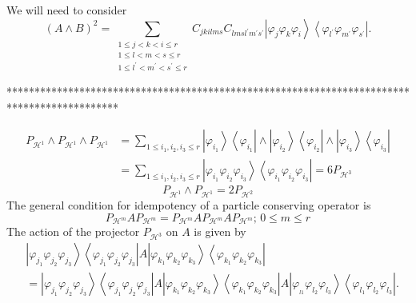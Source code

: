 \documentclass[aps,preprint]{revtex4}%
\begin{document}
We will need to consider
\begin{equation}
\left(  A\wedge B\right)  ^{2}=\sum_{\substack{1\leq j<k<i\leq r\\1\leq
l<m<s\leq r\\1\leq l^{\prime}<m^{\prime}<s^{\prime}\leq r}}C_{jkilms}%
C_{lmsl^{\prime}m^{\prime}s^{\prime}}\left\vert \varphi_{j}\varphi_{k}%
\varphi_{i}\right\rangle \left\langle \varphi_{l^{\prime}}\varphi_{m^{\prime}%
}\varphi_{s^{\prime}}\right\vert .
\end{equation}


********************************************************************************************%

\begin{align}
P_{\mathcal{H}^{1}}\wedge P_{\mathcal{H}^{1}}\wedge P_{\mathcal{H}^{1}}  &
=\sum_{1\leq i_{1},i_{2},i_{3}\leq r}\left\vert \varphi_{i_{1}}\right\rangle
\left\langle \varphi_{i_{1}}\right\vert \wedge\left\vert \varphi_{i_{2}%
}\right\rangle \left\langle \varphi_{i_{2}}\right\vert \wedge\left\vert
\varphi_{i_{3}}\right\rangle \left\langle \varphi_{i_{3}}\right\vert \\
&  =\sum_{1\leq i_{1},i_{2},i_{3}\leq r}\left\vert \varphi_{i_{1}}%
\varphi_{i_{2}}\varphi_{i_{3}}\right\rangle \left\langle \varphi_{i_{1}%
}\varphi_{i_{2}}\varphi_{i_{3}}\right\vert =6P_{\mathcal{H}^{3}}%
\end{align}%
\begin{equation}
P_{\mathcal{H}^{1}}\wedge P_{\mathcal{H}^{1}}=2P_{\mathcal{H}^{2}}%
\end{equation}
The general condition for idempotency of a particle conserving operator is
\begin{equation}
P_{\mathcal{H}^{m}}AP_{\mathcal{H}^{m}}=P_{\mathcal{H}^{m}}AP_{\mathcal{H}%
^{m}}AP_{\mathcal{H}^{m}};\,0\leq m\leq r
\end{equation}
The action of the projector $P_{\mathcal{H}^{3}}$ on $A$ is given by
\begin{align}
&  \left\vert \varphi_{j_{1}}\varphi_{j_{2}}\varphi_{j_{3}}\right\rangle
\left\langle \varphi_{j_{1}}\varphi_{j_{2}}\varphi_{j_{3}}\right\vert
A\left\vert \varphi_{k_{1}}\varphi_{k_{2}}\varphi_{k_{3}}\right\rangle
\left\langle \varphi_{k_{1}}\varphi_{k_{2}}\varphi_{k_{3}}\right\vert
\nonumber\\
&  =\left\vert \varphi_{j_{1}}\varphi_{j_{2}}\varphi_{j_{3}}\right\rangle
\left\langle \varphi_{j_{1}}\varphi_{j_{2}}\varphi_{j_{3}}\right\vert
A\left\vert \varphi_{k_{1}}\varphi_{k_{2}}\varphi_{k_{3}}\right\rangle
\left\langle \varphi_{k_{1}}\varphi_{k_{2}}\varphi_{k_{3}}\right\vert
A\left\vert \varphi_{_{l1}}\varphi_{l_{2}}\varphi_{l_{3}}\right\rangle
\left\langle \varphi_{l_{1}}\varphi_{l_{2}}\varphi_{l_{3}}\right\vert .
\end{align}
\end{document}
